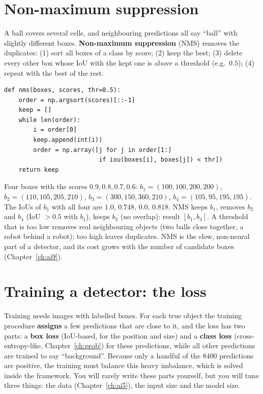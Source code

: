 \section*{Non-maximum suppression}
A ball covers several cells, and neighbouring predictions all say ``ball'' with slightly different boxes. \textbf{Non-maximum suppression} (NMS) removes the duplicates: (1) sort all boxes of a class by score; (2) keep the best; (3) delete every other box whose IoU with the kept one is above a threshold (e.g.\ $0.5$); (4) repeat with the best of the rest.
\begin{verbatim}
def nms(boxes, scores, thr=0.5):
    order = np.argsort(scores)[::-1]
    keep = []
    while len(order):
        i = order[0]
        keep.append(int(i))
        order = np.array([j for j in order[1:]
                          if iou(boxes[i], boxes[j]) < thr])
    return keep
\end{verbatim}
\begin{example}
Four boxes with the scores $0.9,0.8,0.7,0.6$: $b_1=(100,100,200,200)$, $b_2=(110,105,205,210)$, $b_3=(300,150,360,210)$, $b_4=(105,95,195,195)$. The IoUs of $b_1$ with all four are $1.0,\,0.748,\,0.0,\,0.818$. NMS keeps $b_1$, removes $b_2$ and $b_4$ (IoU $>0.5$ with $b_1$), keeps $b_3$ (no overlap): result $[b_1,b_3]$. A threshold that is too low removes real neighbouring objects (two balls close together, a robot behind a robot); too high leaves duplicates. NMS is the slow, non-neural part of a detector, and its cost grows with the number of candidate boxes (Chapter~\ref{ch:ai9}).
\end{example}

\section*{Training a detector: the loss}
Training needs images with labelled boxes. For each true object the training procedure \textbf{assigns} a few predictions that are close to it, and the loss has two parts: a \textbf{box loss} (IoU-based, for the position and size) and a \textbf{class loss} (cross-entropy-like, Chapter~\ref{ch:prob}) for these predictions, while all other predictions are trained to say ``background''. Because only a handful of the $8400$ predictions are positive, the training must balance this heavy imbalance, which is solved inside the framework. You will rarely write these parts yourself, but you will tune three things: the data (Chapter~\ref{ch:ai5}), the input size and the model size.

